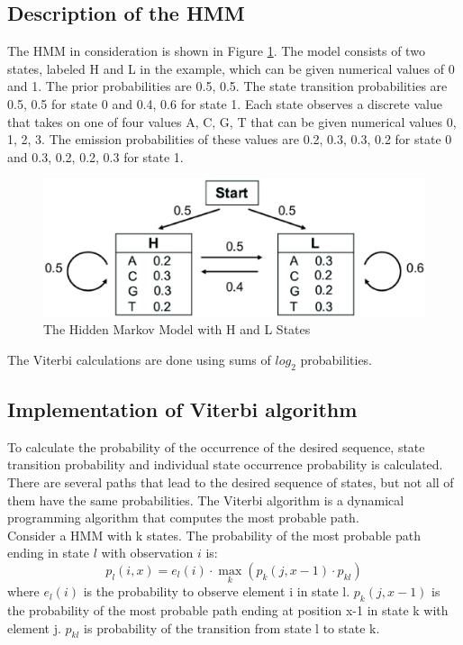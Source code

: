 \documentclass[12pt]{article}
\begin{document}
\subsection{Description of the HMM}
The HMM in consideration is shown in Figure \ref{fig:HMM}. The model consists of two states, labeled H and L in the example, which can be given numerical values of 0 and 1. The prior probabilities are {0.5, 0.5}. The state transition
probabilities are {0.5, 0.5} for state 0 and {0.4, 0.6} for state 1. Each state observes a discrete value that takes on one of four values {A, C, G, T } that can be given numerical values {0, 1, 2, 3}. The emission probabilities of these values are {0.2, 0.3, 0.3, 0.2} for state 0 and {0.3, 0.2, 0.2, 0.3} for state 1.
 
 \begin{figure}[H]
	\centering
	\includegraphics[scale=0.4]{HMM.eps}
	\caption{The Hidden Markov Model with H and L States}
	\label{fig:HMM}
\end{figure}

The Viterbi calculations are done using sums of $log_2$ probabilities.

\subsection{Implementation of Viterbi algorithm}
To calculate the probability of the occurrence of the desired sequence, state transition probability and individual state occurrence probability is calculated. There are several paths that lead to the desired sequence of states, but not all of them have the same probabilities. The Viterbi algorithm is a dynamical programming algorithm that computes the most probable path. \\

Consider a HMM with k states. The probability of the most probable path ending in state $l$ with observation $i$ is: 
\begin{equation}
	p_l(i,x) = e_l(i) \cdot \displaystyle\max_k(p_k(j,x-1) \cdot p_{kl})
\end{equation}
where $e_l(i)$ is the  probability to observe element i in state l. $p_k(j,x-1)$ is the probability of the most probable path ending at position x-1 in state k with element j. $p_{kl}$ is probability of the transition from state l to state k. \\
\end{document}
